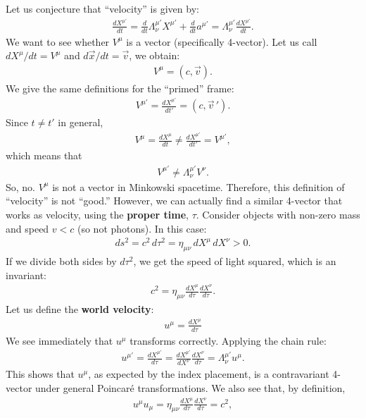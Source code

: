 \documentclass{article}
\theoremstyle{definition}
\begin{document}
Let us conjecture that ``velocity'' is given by:
\begin{align*}
\frac{dX^{\mu'}}{dt} = \frac{d}{dt}\Lambda^{\mu'}_\nu X^{\mu'} + \frac{d}{dt}a^{\mu'} = \Lambda^{\mu'}_\nu \frac{dX^{\mu'}}{dt}.
\end{align*}
We want to see whether $V^\mu$ is a vector (specifically 4-vector). Let us call $dX^{\mu}/dt = V^\mu$ and $d\vec{x}/dt = \vec{v}$, we obtain:
\begin{align*}
V^\mu = (c,\vec{v}).
\end{align*}
We give the same definitions for the ``primed'' frame:
\begin{align*}
V^{\mu'} = \frac{dX^{\mu'}}{dt'} = (c, \vec{v}\,').
\end{align*}
Since $t \neq t'$ in general, 
\begin{align*}
V^{\mu} = \frac{dX^\mu}{dt} \neq \frac{dX^{\mu'}}{dt'} = V^{\mu'},
\end{align*}
which means that
\begin{align*}
V^{\mu'} \neq \Lambda^{\mu'}_\nu V^{\nu}.
\end{align*}
So, no. $V^\mu$ is not a vector in Minkowski spacetime. Therefore, this definition of ``velocity'' is not ``good.'' However, we can actually find a similar 4-vector that works as velocity, using the \textbf{proper time}, $\tau$. Consider objects with non-zero mass and speed $v < c$ (so not photons). In this case:
\begin{align*}
ds^2 = c^2\,d\tau^2 = \eta_{\mu\nu}\,dX^\mu\,dX^\nu > 0.
\end{align*}
If we divide both sides by $d\tau^2$, we get the speed of light squared, which is an invariant:
\begin{align*}
c^2 = \eta_{\mu\nu}\frac{dX^\mu}{d\tau}\frac{dX^\nu}{d\tau}. 
\end{align*}
Let us define the \textbf{world velocity}:
\begin{align*}
\boxed{u^\mu = \frac{dX^\mu}{d\tau}}
\end{align*}
We see immediately that $u^\mu$ transforms correctly. Applying the chain rule:
\begin{align*}
u^{\mu'} = \frac{dX^{\mu'}}{d\tau} = \frac{dX^{\mu'}}{dX^\nu}\frac{dX^\nu}{d\tau} = \Lambda^{\mu'}_\nu u^\mu.
\end{align*}
This shows that $u^\mu$, as expected by the index placement, is a contravariant 4-vector under general Poincar\'e transformations. We also see that, by definition,
\begin{align*}
u^\mu u_\mu = \eta_{\mu\nu}\frac{dX^\mu}{d\tau}\frac{dX^\nu}{d\tau} = c^2,
\end{align*}
\end{document}
